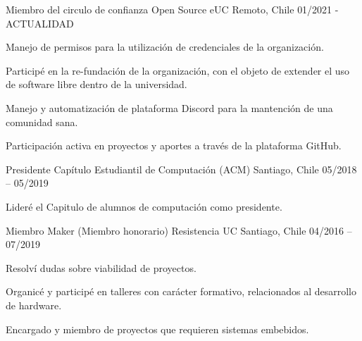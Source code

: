

\begin{cventries}

  \cventry
    {Miembro del circulo de confianza} %
    {Open Source eUC} %
    {Remoto, Chile} %
    {01/2021 - ACTUALIDAD} %
    {
      \begin{cvitems} %
        \item {Manejo de permisos para la utilización de credenciales de la organización.}
        \item {Participé en la re-fundación de la organización, con el objeto de extender el uso de software libre dentro de la universidad.}
        \item {Manejo y automatización de plataforma Discord para la mantención de una comunidad sana.}
        \item {Participación activa en proyectos y aportes a través de la plataforma GitHub.}
      \end{cvitems}
    }

  \cventry
    {Presidente} %
    {Capítulo Estudiantil de Computación (ACM)} %
    {Santiago, Chile} %
    {05/2018 – 05/2019} %
    {
      \begin{cvitems} %
        \item {Lideré el Capitulo de alumnos de computación como presidente.}
      \end{cvitems}
    }


  \cventry
    {Miembro Maker (Miembro honorario)} %
    {Resistencia UC} %
    {Santiago, Chile} %
    {04/2016 – 07/2019} %
    {
      \begin{cvitems} %
        \item {Resolví dudas sobre viabilidad de proyectos.}
        \item {Organicé y participé en talleres con carácter formativo, relacionados al desarrollo de hardware.}
        \item {Encargado y miembro de proyectos que requieren sistemas embebidos.}
      \end{cvitems}
    }


\end{cventries}
